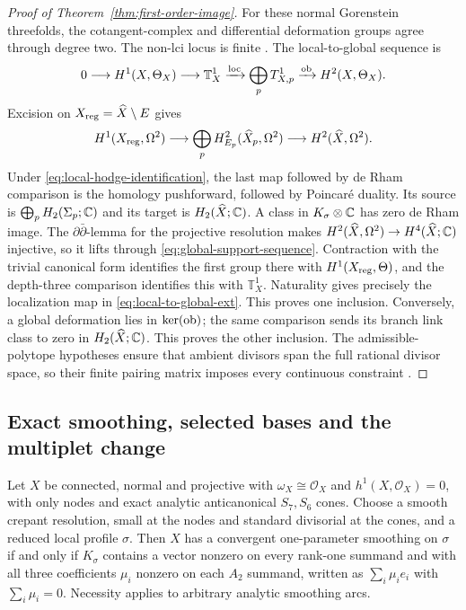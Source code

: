 \begin{proof}[Proof of Theorem~\ref{thm:first-order-image}]
For these normal Gorenstein threefolds, the cotangent-complex
and differential deformation groups agree through degree two. The
non-lci locus is finite \cite[Lemma~2.2]{Wuebben:2026smoothing}.
The local-to-global sequence is
\begin{equation}
 0\longrightarrow H^1(X,\Theta_X)\longrightarrow\mathbb T_X^1
 \xrightarrow{\rm loc}\bigoplus_pT^1_{X,p}
 \xrightarrow{\rm ob}H^2(X,\Theta_X).
 \label{eq:local-to-global-ext}
\end{equation}
Excision on $X_{\rm reg}=\widehat X\setminus E$ gives
\begin{equation}
 H^1(X_{\rm reg},\Omega^2)\longrightarrow
 \bigoplus_pH^2_{E_p}(\widehat X_p,\Omega^2)
 \longrightarrow H^2(\widehat X,\Omega^2).
 \label{eq:global-support-sequence}
\end{equation}
Under \eqref{eq:local-hodge-identification}, the last map followed
by de Rham comparison is the homology pushforward, followed
by Poincar\'e duality. Its source is
$\bigoplus_pH_2(\Sigma_p;\mathbb C)$ and its target is
$H_2(\widehat X;\mathbb C)$. A class in $K_\sigma\otimes\mathbb C$ has
zero de Rham image. The $\partial\bar\partial$-lemma for the
projective resolution makes $H^2(\widehat X,\Omega^2)\to H^4(\widehat X;\mathbb C)$
injective, so it lifts through \eqref{eq:global-support-sequence}.
Contraction with the trivial canonical form identifies the first
group there with $H^1(X_{\rm reg},\Theta)$, and the depth-three
comparison identifies this with $\mathbb T_X^1$.
Naturality gives precisely the localization map in
\eqref{eq:local-to-global-ext}. This proves one inclusion.
Conversely, a global deformation lies in $\ker({\rm ob})$;
the same comparison sends its branch link class to zero in
$H_2(\widehat X;\mathbb C)$. This proves the other inclusion.
The admissible-polytope hypotheses ensure that ambient divisors
span the full rational divisor space, so their finite pairing
matrix imposes every continuous constraint
\cite[Proposition~8.3]{Wuebben:2026obstruction}.
\end{proof}

\subsection{Exact smoothing, selected bases and the multiplet change}

\begin{theorem}\label{thm:all-orders-necessity}
Let $X$ be connected, normal and projective with
$\omega_X\cong\mathcal O_X$ and $h^1(X,\mathcal O_X)=0$,
with only nodes and exact analytic anticanonical $S_7,S_6$ cones.
Choose a smooth crepant resolution, small at the nodes and standard
divisorial at the cones, and a reduced local profile $\sigma$.
Then $X$ has a convergent one-parameter smoothing on $\sigma$ if
and only if $K_\sigma$ contains a vector nonzero on every rank-one
summand and with all three coefficients $\mu_i$ nonzero on each
$A_2$ summand, written as $\sum_i\mu_i e_i$ with $\sum_i\mu_i=0$.
Necessity applies to arbitrary analytic smoothing arcs.
\end{theorem}

